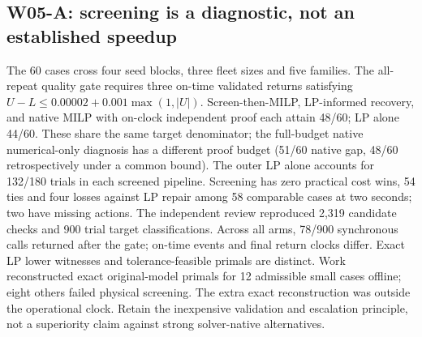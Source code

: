 \documentclass[11pt,letterpaper]{article}
\begin{document}
\subsection{W05-A: screening is a diagnostic, not an established speedup}
The 60 cases cross four seed blocks, three fleet sizes and five families. The all-repeat quality gate requires three on-time validated returns satisfying $U-L\le0.00002+0.001\max(1,|U|)$. Screen-then-MILP, LP-informed recovery, and native MILP with on-clock independent proof each attain 48/60; LP alone 44/60. These share the same target denominator; the full-budget native numerical-only diagnosis has a different proof budget (51/60 native gap, 48/60 retrospectively under a common bound). The outer LP alone accounts for 132/180 trials in each screened pipeline. Screening has zero practical cost wins, 54 ties and four losses against LP repair among 58 comparable cases at two seconds; two have missing actions. The independent review reproduced 2,319 candidate checks and 900 trial target classifications. Across all arms, 78/900 synchronous calls returned after the gate; on-time events and final return clocks differ. Exact LP lower witnesses and tolerance-feasible primals are distinct. Work reconstructed exact original-model primals for 12 admissible small cases offline; eight others failed physical screening. The extra exact reconstruction was outside the operational clock. Retain the inexpensive validation and escalation principle, not a superiority claim against strong solver-native alternatives.
\end{document}
